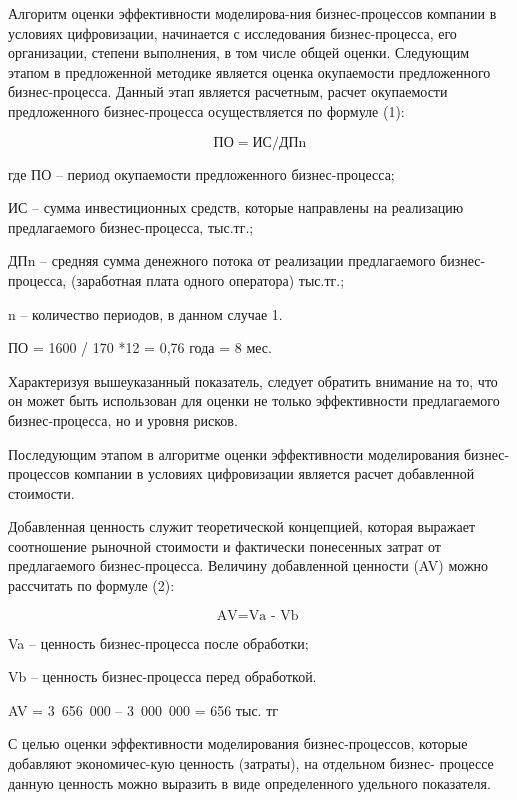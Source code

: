 \begin{multicols}{2}


Алгоритм оценки эффективности моделирова-ния бизнес-процессов компании в
условиях цифровизации, начинается с исследования бизнес-процесса, его
организации, степени выполнения, в том числе общей оценки. Следующим
этапом в предложенной методике является оценка окупаемости предложенного
бизнес-процесса. Данный этап является расчетным, расчет окупаемости
предложенного бизнес-процесса осуществляется по формуле (1):


\begin{equation}
  \text{ПО} = \text{ИС} / \text{ДПn}
\end{equation}

где ПО -- период окупаемости предложенного бизнес-процесса;

ИС -- сумма инвестиционных средств, которые направлены на реализацию
предлагаемого бизнес-процесса, тыс.тг.;

ДПn -- средняя сумма денежного потока от реализации предлагаемого
бизнес-процесса, (заработная плата одного оператора) тыс.тг.;

n -- количество периодов, в данном случае 1.

ПО = 1600 / 170 *12 = 0,76 года = 8 мес.

Характеризуя вышеуказанный показатель, следует обратить внимание на то,
что он может быть использован для оценки не только эффективности
предлагаемого бизнес-процесса, но и уровня рисков.

Последующим этапом в алгоритме оценки эффективности моделирования
бизнес-процессов компании в условиях цифровизации является расчет
добавленной стоимости.

Добавленная ценность служит теоретической концепцией, которая выражает
соотношение рыночной стоимости и фактически понесенных затрат от
предлагаемого бизнес-процесса. Величину добавленной ценности (AV) можно
рассчитать по формуле (2):

\begin{equation}
  \text{AV} = \text{Va - Vb }
\end{equation}
 

Va -- ценность бизнес-процесса после обработки;

Vb -- ценность бизнес-процесса перед обработкой.

\begin{center}
AV = 3~656~000 -- 3~000~000 = 656 тыс. тг
\end{center}


С целью оценки эффективности моделирования бизнес-процессов, которые
добавляют экономичес-кую ценность (затраты), на отдельном бизнес-
процессе данную ценность можно выразить в виде определенного удельного
показателя.


\end{multicols}
